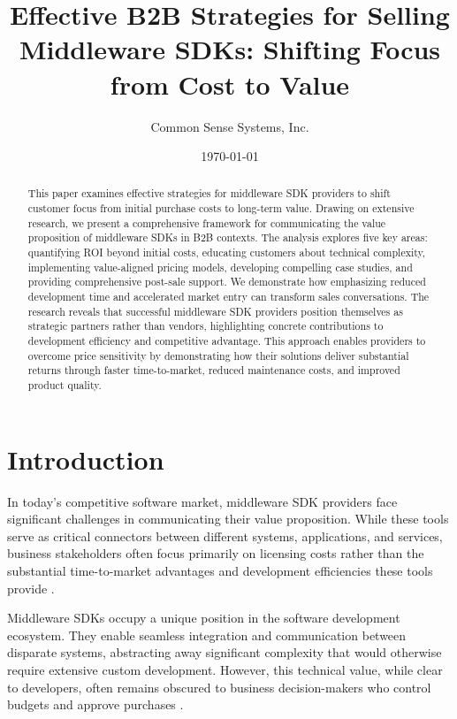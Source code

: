 \documentclass[11pt,a4paper]{article}
\title{\LARGE\textbf{Effective B2B Strategies for Selling Middleware SDKs: Shifting Focus from Cost to Value}}
\author{Common Sense Systems, Inc.}
\date{\today}
\begin{document}
\maketitle
\thispagestyle{fancy}

\begin{abstract}
This paper examines effective strategies for middleware SDK providers to shift customer focus from initial purchase costs to long-term value. Drawing on extensive research, we present a comprehensive framework for communicating the value proposition of middleware SDKs in B2B contexts. The analysis explores five key areas: quantifying ROI beyond initial costs, educating customers about technical complexity, implementing value-aligned pricing models, developing compelling case studies, and providing comprehensive post-sale support. We demonstrate how emphasizing reduced development time and accelerated market entry can transform sales conversations. The research reveals that successful middleware SDK providers position themselves as strategic partners rather than vendors, highlighting concrete contributions to development efficiency and competitive advantage. This approach enables providers to overcome price sensitivity by demonstrating how their solutions deliver substantial returns through faster time-to-market, reduced maintenance costs, and improved product quality.
\end{abstract}

\tableofcontents
\newpage

\section{Introduction}

In today's competitive software market, middleware SDK providers face significant challenges in communicating their value proposition. While these tools serve as critical connectors between different systems, applications, and services, business stakeholders often focus primarily on licensing costs rather than the substantial time-to-market advantages and development efficiencies these tools provide \cite{tradecentric2023}.

Middleware SDKs occupy a unique position in the software development ecosystem. They enable seamless integration and communication between disparate systems, abstracting away significant complexity that would otherwise require extensive custom development. However, this technical value, while clear to developers, often remains obscured to business decision-makers who control budgets and approve purchases \cite{ibm2023}.
\end{document}

